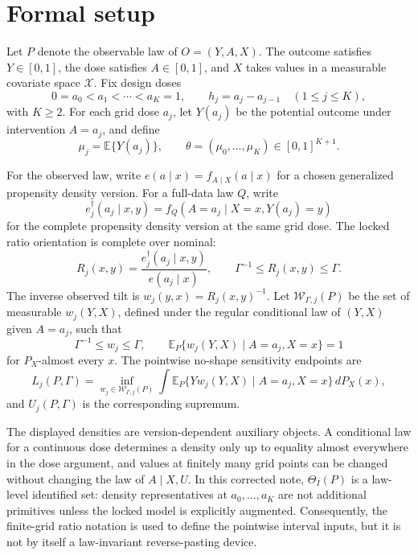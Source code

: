 \documentclass[11pt]{article}
\newcommand{\E}{\mathbb{E}}
\theoremstyle{definition}
\theoremstyle{plain}
\theoremstyle{remark}
\begin{document}
\section{Formal setup}
Let \(P\) denote the observable law of \(O=(Y,A,X)\).  The outcome satisfies \(Y\in[0,1]\), the dose satisfies \(A\in[0,1]\), and \(X\) takes values in a measurable covariate space \(\mathcal X\).  Fix design doses
\[
  0=a_0<a_1<\cdots<a_K=1,\qquad h_j=a_j-a_{j-1}\quad(1\le j\le K),
\]
with \(K\ge2\).  For each grid dose \(a_j\), let \(Y(a_j)\) be the potential outcome under intervention \(A=a_j\), and define
\[
  \mu_j=\E\{Y(a_j)\},\qquad
  \theta=(\mu_0,\ldots,\mu_K)\in[0,1]^{K+1}.
\]

For the observed law, write \(e(a\mid x)=f_{A\mid X}(a\mid x)\) for a chosen generalized propensity density version.  For a full-data law \(Q\), write
\[
  e^\dagger_j(a_j\mid x,y)
  =
  f_Q(A=a_j\mid X=x,Y(a_j)=y)
\]
for the complete propensity density version at the same grid dose.  The locked ratio orientation is complete over nominal:
\[
  R_j(x,y)=\frac{e^\dagger_j(a_j\mid x,y)}{e(a_j\mid x)},
  \qquad
  \Gamma^{-1}\le R_j(x,y)\le \Gamma.
\]
The inverse observed tilt is \(w_j(y,x)=R_j(x,y)^{-1}\).  Let \(\mathcal W_{\Gamma,j}(P)\) be the set of measurable \(w_j(Y,X)\), defined under the regular conditional law of \((Y,X)\) given \(A=a_j\), such that
\[
  \Gamma^{-1}\le w_j\le\Gamma,\qquad
  \E_P\{w_j(Y,X)\mid A=a_j,X=x\}=1
\]
for \(P_X\)-almost every \(x\).  The pointwise no-shape sensitivity endpoints are
\[
  L_j(P,\Gamma)=
  \inf_{w_j\in\mathcal W_{\Gamma,j}(P)}
  \int \E_P\{Yw_j(Y,X)\mid A=a_j,X=x\}\,dP_X(x),
\]
and \(U_j(P,\Gamma)\) is the corresponding supremum.

The displayed densities are version-dependent auxiliary objects.  A conditional law for a continuous dose determines a density only up to equality almost everywhere in the dose argument, and values at finitely many grid points can be changed without changing the law of \(A\mid X,U\).  In this corrected note, \(\Theta_I(P)\) is a law-level identified set: density representatives at \(a_0,\ldots,a_K\) are not additional primitives unless the locked model is explicitly augmented.  Consequently, the finite-grid ratio notation is used to define the pointwise interval inputs, but it is not by itself a law-invariant reverse-pasting device.
\end{document}
